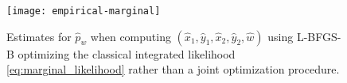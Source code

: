 

\begin{figure}
\centering
\texttt{[image: empirical-marginal]}
\caption{
    Estimates for $\hat{p}_w$ when computing $(\hat{x}_1, \hat{y}_1, \hat{x}_2, \hat{y}_2, \hat{w})$ using L-BFGS-B optimizing the classical integrated likelihood \eqref{eq:marginal_likelihood} rather than a joint optimization procedure.
}
\label{fig:bl-general-marginal}
\end{figure}
%


